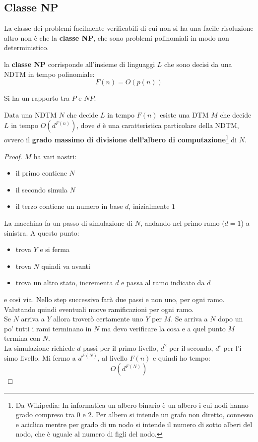 \subsection{Classe NP}
La classe dei problemi facilmente verificabili di cui non si ha una facile
risoluzione altro non è che la \textbf{classe NP}, che sono problemi polinomiali
in modo non deterministico.
\begin{definizione}
  la \textbf{classe NP} corrisponde all'insieme di linguaggi $L$ che sono decisi
  da una NDTM in tempo polinomiale:
  \[F(n)=O(p(n))\]
\end{definizione}
Si ha un rapporto tra $P$ e $NP$.
\begin{definizione}
  Data una NDTM $N$ che decide $L$ in tempo $F(n)$ esiste una DTM $M$ che decide
  $L$ in tempo $O(d^{F(n)})$, dove $d$ è una caratteristica particolare della
  NDTM, ovvero il \textbf{grado massimo di divisione dell'albero di
    computazione}\footnote{Da Wikipedia: In informatica un albero binario è un albero i cui nodi hanno grado compreso tra 0 e 2. Per albero si intende un grafo non diretto, connesso e aciclico mentre per grado di un nodo si intende il numero di sotto alberi del nodo, che è uguale al numero di figli del nodo.} di $N$. 
\end{definizione}
\begin{proof}
  $M$ ha vari nastri:
  \begin{itemize}
    \item il primo contiene $N$
    \item il secondo simula $N$
    \item il terzo contiene un numero in base $d$, inizialmente $1$
  \end{itemize}
  La macchina fa un passo di simulazione di $N$, andando nel primo ramo ($d=1$)
  a sinistra. A questo punto:
  \begin{itemize}
    \item trova $Y$ e si ferma
    \item trova $N$ quindi va avanti
    \item trova un altro stato, incrementa $d$ e passa al ramo indicato da
    $d$
  \end{itemize}
  e così via. Nello step successivo farà due passi e non uno, per ogni
  ramo. Valutando quindi eventuali nuove ramificazioni per ogni ramo. \\
  Se $N$ arriva a $Y$ allora troverò certamente uno $Y$ per $M$. Se arriva a $N$
  dopo un po' tutti i rami terminano in $N$ ma devo verificare la cosa e a quel
  punto $M$ termina con $N$.\\
  La simulazione richiede $d$ passi per il primo livello, $d^2$ per il secondo,
  $d^i$ per l'i-simo livello. Mi fermo a $d^{F(N)}$, al livello $F(n)$ e quindi
  ho tempo: 
  \[O(d^{F(N)})\]
\end{proof}
